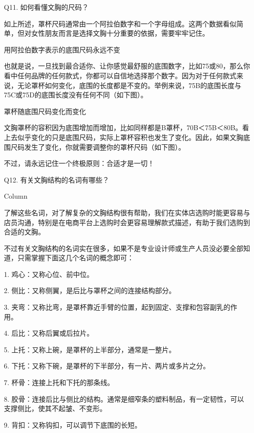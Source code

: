 \documentclass[12pt,UTF8]{ctexbook}
\begin{document}
Q11. 如何看懂文胸的尺码？


如上所述，罩杯尺码通常由一个阿拉伯数字和一个字母组成。这两个数据看似简单，但对女性朋友而言是选择文胸十分重要的依据，需要牢牢记住。

用阿拉伯数字表示的底围尺码永远不变

也就是说，一旦找到最合适你、让你感觉最舒服的底围数字，比如75或80，那么你看中任何品牌的任何款式，你都可以自信地选择那个数字。因为对于任何款式来说，无论罩杯如何变化，底围的长度都是不变的。举例来说，75B的底围长度与75C或75D的底围长度没有任何不同（如下图）。



罩杯随底围尺码变化而变化

文胸罩杯的容积因为底围增加而增加，比如同样都是B罩杯，70B＜75B＜80B。看上去似乎变化的只是底围尺码，实际上罩杯容积也发生了变化。因此，如果文胸底围尺码发生了变化，你就需要调整你的罩杯尺码（如下图）。



不过，请永远记住一个终极原则：合适才是一切！





Q12. 有关文胸结构的名词有哪些？



Column

了解这些名词，对了解复杂的文胸结构很有帮助，我们在实体店选购时能更容易与店员沟通，特别是在电商平台上选购时会更容易理解款式描述，有助于我们选购到合适的文胸。

不过有关文胸结构的名词实在很多，如果不是专业设计师或生产人员没必要全部知道，只需掌握下面这几个名词的概念即可：



1. 鸡心：又称心位、前中位。

2. 侧比：又称侧翼，是后比与罩杯之间的连接结构部分。

3. 夹弯：又称比弯，是罩杯靠近手臂的位置，起到固定、支撑和包容副乳的作用。

4. 后比：又称后翼或后拉片。

5. 上托：又称上碗，是罩杯的上半部分，通常是一整片。

6. 下托：又称下碗，是罩杯的下半部分，有一片、两片或多片之分。

7. 杯骨：连接上托和下托的那条线。

8. 胶骨：连接后比与侧比的结构。通常是细窄条的塑料制品，有一定韧性，可以支撑侧比，使其不起皱、不变形。

9. 背扣：又称钩扣，可以调节下底围的长短。
\end{document}
